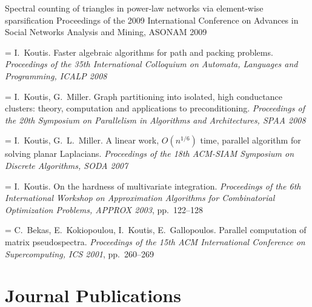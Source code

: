 \documentclass[11pt,letterpaper]{article}
\newlength{\datecol}\setlength{\datecol}{1.06in}
\newlength{\entrysep}\setlength{\entrysep}{4pt}
\newcommand{\datefont}{\small\color{muted}}
\newcommand{\me}{I.~Koutis}
\newcommand{\pub}[4]{\par\addvspace{\entrysep}\noindent\hangindent=\datecol\hangafter=1
  \makebox[\datecol][l]{\datefont [#1]}#2. #3. \textit{#4}}
\begin{document}
  {Spectral counting of triangles in power-law networks via element-wise sparsification}
  {Proceedings of the 2009 International Conference on Advances in Social Networks Analysis and Mining, ASONAM 2009}
\pub{5}{\me}
  {Faster algebraic algorithms for path and packing problems}
  {Proceedings of the 35th International Colloquium on Automata, Languages and Programming, ICALP 2008}
\pub{4}{\me, G.~Miller}
  {Graph partitioning into isolated, high conductance clusters: theory, computation and applications to preconditioning}
  {Proceedings of the 20th Symposium on Parallelism in Algorithms and Architectures, SPAA 2008}
\pub{3}{\me, G.~L.~Miller}
  {A linear work, $O(n^{1/6})$ time, parallel algorithm for solving planar Laplacians}
  {Proceedings of the 18th ACM-SIAM Symposium on Discrete Algorithms, SODA 2007}
\pub{2}{\me}
  {On the hardness of multivariate integration}
  {Proceedings of the 6th International Workshop on Approximation Algorithms for Combinatorial
   Optimization Problems, APPROX 2003}, pp.~122--128
\pub{1}{C.~Bekas, E.~Kokiopoulou, \me, E.~Gallopoulos}
  {Parallel computation of matrix pseudospectra}
  {Proceedings of the 15th ACM International Conference on Supercomputing, ICS 2001}, pp.~260--269

\section{Journal Publications}
\end{document}
